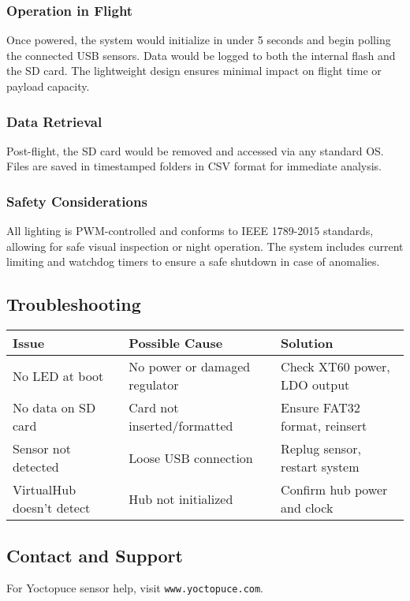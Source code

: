 \documentclass[../main.tex]{subfiles}
\begin{document}
\subsubsection{Operation in Flight}
Once powered, the system would initialize in under 5 seconds and begin polling the connected USB sensors. Data would be logged to both the internal flash and the SD card. The lightweight design ensures minimal impact on flight time or payload capacity.

\subsubsection{Data Retrieval}
Post-flight, the SD card would be removed and accessed via any standard OS. Files are saved in timestamped folders in CSV format for immediate analysis.

\subsubsection{Safety Considerations}
All lighting is PWM-controlled and conforms to IEEE 1789-2015 standards, allowing for safe visual inspection or night operation. The system includes current limiting and watchdog timers to ensure a safe shutdown in case of anomalies.

\subsection{Troubleshooting}
\begin{tabular}{|l|l|l|}
\hline
\textbf{Issue} & \textbf{Possible Cause} & \textbf{Solution} \\
\hline
No LED at boot & No power or damaged regulator & Check XT60 power, LDO output \\
\hline
No data on SD card & Card not inserted/formatted & Ensure FAT32 format, reinsert \\
\hline
Sensor not detected & Loose USB connection & Replug sensor, restart system \\
\hline
VirtualHub doesn't detect & Hub not initialized & Confirm hub power and clock \\
\hline
\end{tabular}

\subsection{Contact and Support}
For Yoctopuce sensor help, visit \texttt{www.yoctopuce.com}.
\end{document}

